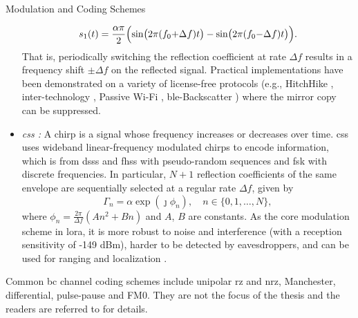 \begin{section}{}
\begin{subsection}{Modulation and Coding Schemes}
\begin{itemize}
			\begin{equation}
				s_1(t) = \frac{\alpha \pi}{2} \Bigl(\sin\bigl(2 \pi (f_0 {+} \Delta f) t\bigr) - \sin\bigl(2 \pi (f_0 {-} \Delta f) t\bigr)\Bigr).
			\end{equation}
			That is, periodically switching the reflection coefficient at rate $\Delta f$ results in a frequency shift $\pm \Delta f$ on the reflected signal.
			Practical implementations have been demonstrated on a variety of license-free protocols (e.g., HitchHike \cite{Zhang2016a}, inter-technology \cite{Iyer2016}, Passive Wi-Fi \cite{Kellogg2017}, \gls{ble}-Backscatter \cite{Ensworth2017}) where the mirror copy can be suppressed.
			\item \emph{\gls{css} \cite{Talla2017}:} A chirp is a signal whose frequency increases or decreases over time.
			\gls{css} uses wideband linear-frequency modulated chirps to encode information, which is from \gls{dsss} and \gls{fhss} with pseudo-random sequences and \gls{fsk} with discrete frequencies.
			In particular, $N+1$ reflection coefficients of the same envelope are sequentially selected at a regular rate $\Delta f$, given by
			\begin{equation}
				\Gamma_n = \alpha \exp(\jmath \phi_n), \quad n \in \{0, 1, \ldots, N\},
			\end{equation}
			where $\phi_n = \frac{2 \pi}{\Delta f}(A n^2 + B n)$ and $A$, $B$ are constants.
			As the core modulation scheme in \gls{lora}, it is more robust to noise and interference (with a reception sensitivity of -149 dBm), harder to be detected by eavesdroppers, and can be used for ranging and localization \cite{Abbasi2021a}.
		\end{itemize}
		Common \gls{bc} channel coding schemes include unipolar \gls{rz} and \gls{nrz}, Manchester, differential, pulse-pause and FM0.
		They are not the focus of the thesis and the readers are referred to \cite[Chapter 2.3]{Hoang2020} for details.
	\end{subsection}


\end{section}
